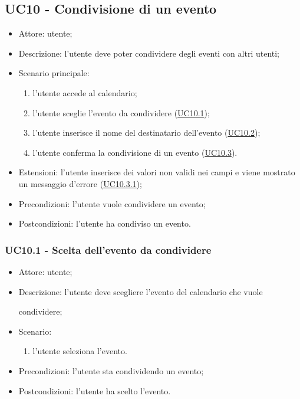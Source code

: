 \subsection{UC10 - Condivisione di un evento}
\begin{itemize}
    \item Attore: utente;
    \item Descrizione: l'utente deve poter condividere degli eventi con altri utenti;
    \item Scenario principale:
        \begin{enumerate}
        \item l'utente accede al calendario;
        \item l'utente sceglie l'evento da condividere (\hyperref[sec: UC10.1]{UC10.1});
        \item l'utente inserisce il nome del destinatario dell'evento (\hyperref[sec: UC10.2]{UC10.2});
        \item l'utente conferma la condivisione di un evento (\hyperref[sec: UC10.3]{UC10.3}).
        \end{enumerate}
    \item Estensioni: l'utente inserisce dei valori non validi nei campi e viene mostrato un messaggio d'errore (\hyperref[sec: UC10.3.1]{UC10.3.1});
    \item Precondizioni: l'utente vuole condividere un evento;
    \item Postcondizioni: l'utente ha condiviso un evento.
\end{itemize}

\subsubsection{UC10.1 - Scelta dell'evento da condividere} \label{sec: UC10.1}
\begin{itemize}
    \item Attore: utente;
    \item Descrizione: l'utente deve scegliere l'evento del calendario che vuole \par condividere;
    \item Scenario:
        \begin{enumerate}
        \item l'utente seleziona l'evento.
        \end{enumerate}
    
    \item Precondizioni: l'utente sta condividendo un evento;
    \item Postcondizioni: l'utente ha scelto l'evento.
\end{itemize}



